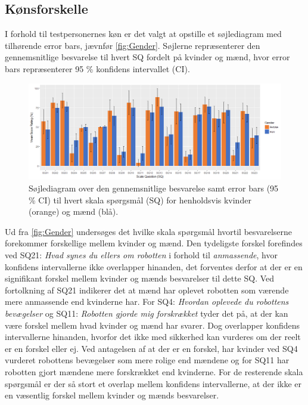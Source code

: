 \subsection{Kønsforskelle}
%
I forhold til testpersonernes køn er det valgt at opstille et søjlediagram med tilhørende error bars, jævnfør \autoref{fig:Gender}. Søjlerne repræsenterer den gennemsnitlige besvarelse til hvert SQ fordelt på kvinder og mænd, hvor error bars repræsenterer 95 \% konfidens intervallet (CI).
%
\begin{figure}[H]
\centering
\includegraphics[width = \textwidth]{Figure/DatabehandlingSkalaer/Demografi/GenderBarPlotErrorBars} 
\caption{Søjlediagram over den gennemsnitlige besvarelse samt error bars (95 \% CI) til hvert skala spørgsmål (SQ) for henholdsvis kvinder (orange) og mænd (blå).}
\label{fig:Gender}
\end{figure}
\noindent
%
Ud fra \autoref{fig:Gender} undersøges det hvilke skala spørgsmål hvortil besvarelserne forekommer forskellige mellem kvinder og mænd. Den tydeligste forskel forefindes ved SQ21: \textit{Hvad synes du ellers om robotten} i forhold til \textit{anmassende}, hvor konfidens intervallerne ikke overlapper hinanden, det forventes derfor at der er en signifikant forskel mellem kvinder og mænds besvarelser til dette SQ. Ved fortolkning af SQ21 indikerer det at mænd har oplevet robotten som værende mere anmassende end kvinderne har. \blankline
%
For SQ4: \textit{Hvordan oplevede du robottens bevægelser} og SQ11: \textit{Robotten gjorde mig forskrækket} tyder det på, at der kan være forskel mellem hvad kvinder og mænd har svarer. Dog overlapper konfidens intervallerne hinanden, hvorfor det ikke med sikkerhed kan vurderes om der reelt er en forskel eller ej. Ved antagelsen af at der er en forskel, har kvinder ved SQ4 vurderet robottens bevægelser som mere rolige end mændene og for SQ11 har robotten gjort mændene mere forskrækket end kvinderne.\blankline
%
For de resterende skala spørgsmål er der så stort et overlap mellem konfidens intervallerne, at der ikke er en væsentlig forskel mellem kvinder og mænds besvarelser. 